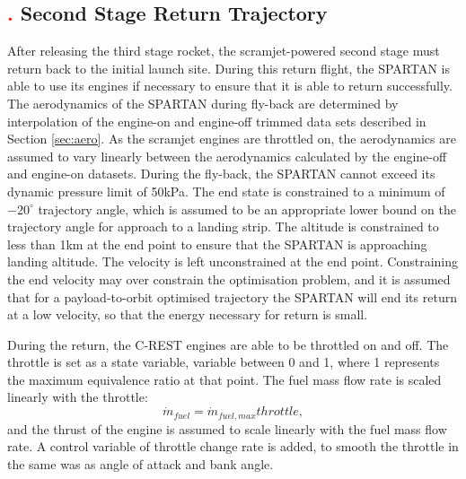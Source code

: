 \subsection{\textcolor{red}{.} Second Stage Return Trajectory}
After releasing the third stage rocket, the scramjet-powered second stage must return back to the initial launch site. During this return flight, the SPARTAN is able to use its engines if necessary to ensure that it is able to return successfully. The aerodynamics of the SPARTAN during fly-back are determined by interpolation of the engine-on and engine-off trimmed data sets described in Section \ref{sec:aero}. As the scramjet engines are throttled on, the aerodynamics are assumed to vary linearly between the aerodynamics calculated by the engine-off and engine-on datasets. 
During the fly-back, the SPARTAN cannot exceed its dynamic pressure limit of 50kPa. 
 The end state is constrained to a minimum of $-20^\circ$ trajectory angle, which is assumed to be an appropriate lower bound on the trajectory angle for approach to a landing strip. The altitude is constrained to less than 1km at the end point to ensure that the SPARTAN is approaching landing altitude.
 The velocity is left unconstrained at the end point. Constraining the end velocity may over constrain the optimisation problem, and it is assumed that for a payload-to-orbit optimised trajectory the SPARTAN will end its return at a low velocity, so that the energy necessary for return is small. 
 
During the return, the C-REST engines are able to be throttled on and off. The throttle is set as a state variable, variable between 0 and 1, where 1 represents the maximum equivalence ratio at that point. The fuel mass flow rate is scaled linearly with the throttle:  
\begin{equation}
\dot{m}_{fuel} = \dot{m}_{fuel,max}throttle,
\end{equation}
and the thrust of the engine is assumed to scale linearly with the fuel mass flow rate. A control variable of throttle change rate is added, to smooth the throttle in the same was as angle of attack and bank angle. 

